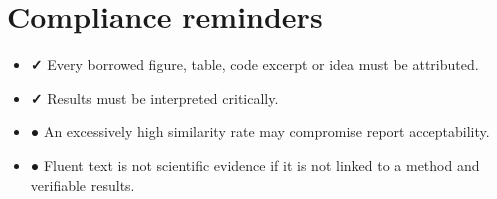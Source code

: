 \section{Compliance reminders}

\begin{itemize}
    \item \textbf{✓} Every borrowed figure, table, code excerpt or idea must be attributed.
    \item \textbf{✓} Results must be interpreted critically.
    \item \textbf{●} An excessively high similarity rate may compromise report acceptability.
    \item \textbf{●} Fluent text is not scientific evidence if it is not linked to a method and verifiable results.
\end{itemize}
